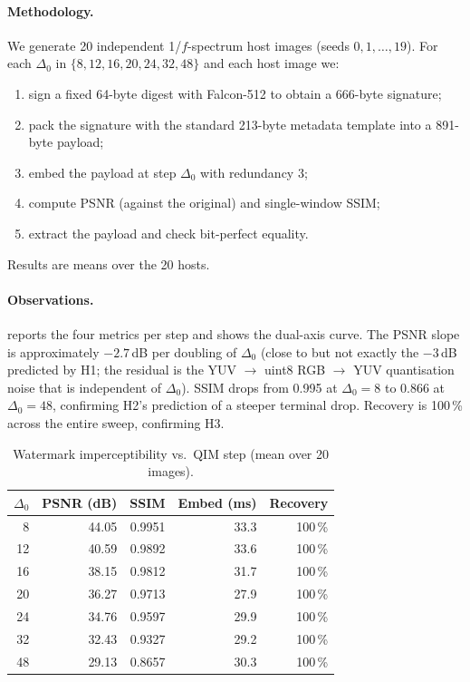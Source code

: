 \documentclass[11pt,a4paper]{article}
\theoremstyle{definition}
\theoremstyle{plain}
\theoremstyle{remark}
\begin{document}
\paragraph{Methodology.}
We generate 20 independent 1/$f$-spectrum host images
(seeds $0,\!1,\!\dots,\!19$). For each $\Delta_0$ in
$\{8, 12, 16, 20, 24, 32, 48\}$ and each host image we:
\begin{enumerate}[nosep]
\item sign a fixed 64-byte digest with Falcon-512 to obtain a 666-byte
signature;
\item pack the signature with the standard 213-byte metadata template
into a 891-byte payload;
\item embed the payload at step $\Delta_0$ with redundancy 3;
\item compute PSNR (against the original) and single-window SSIM;
\item extract the payload and check bit-perfect equality.
\end{enumerate}
Results are means over the 20 hosts.

\paragraph{Observations.}
 reports the four metrics per step and 
shows the dual-axis curve. The PSNR slope is approximately $-2.7$\,dB
per doubling of $\Delta_0$ (close to but not exactly the $-3$\,dB
predicted by H1; the residual is the YUV $\to$ uint8 RGB $\to$ YUV
quantisation noise that is independent of $\Delta_0$). SSIM drops
from 0.995 at $\Delta_0\!=\!8$ to 0.866 at $\Delta_0\!=\!48$,
confirming H2's prediction of a steeper terminal drop. Recovery is
100\,\% across the entire sweep, confirming H3.

\begin{table}[!ht]\centering
\caption{Watermark imperceptibility vs.\ QIM step (mean over 20 images).}
\label{tab:exp2}
\small
\begin{tabular}{r r r r r}
\toprule
$\Delta_0$ & PSNR (dB) & SSIM & Embed (ms) & Recovery\\
\midrule
 8  & 44.05 & 0.9951 & 33.3 & 100\,\%\\
12  & 40.59 & 0.9892 & 33.6 & 100\,\%\\
16  & 38.15 & 0.9812 & 31.7 & 100\,\%\\
20  & 36.27 & 0.9713 & 27.9 & 100\,\%\\
24  & 34.76 & 0.9597 & 29.9 & 100\,\%\\
32  & 32.43 & 0.9327 & 29.2 & 100\,\%\\
48  & 29.13 & 0.8657 & 30.3 & 100\,\%\\
\bottomrule
\end{tabular}
\end{table}
\end{document}
